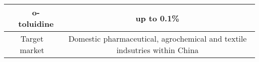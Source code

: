 \begin{landscape}
\begin{table}[]
\begin{tabular}{@{}ccc@{}}
\multicolumn{1}{|c|}{}                                                     & \multicolumn{1}{c|}{o-toluidine}         & \multicolumn{1}{c|}{up to 0.1\%}                                                                                                                                                                                                                                                                                                                                                                                                           \\ \midrule
\multicolumn{2}{c}{Target market}                                                                                     & Domestic pharmaceutical, agrochemical and textile indsutries within China                                                                                                                                                                                                                                                                                                                                                                  \\ \bottomrule
\end{tabular}
\end{table}
\end{landscape}